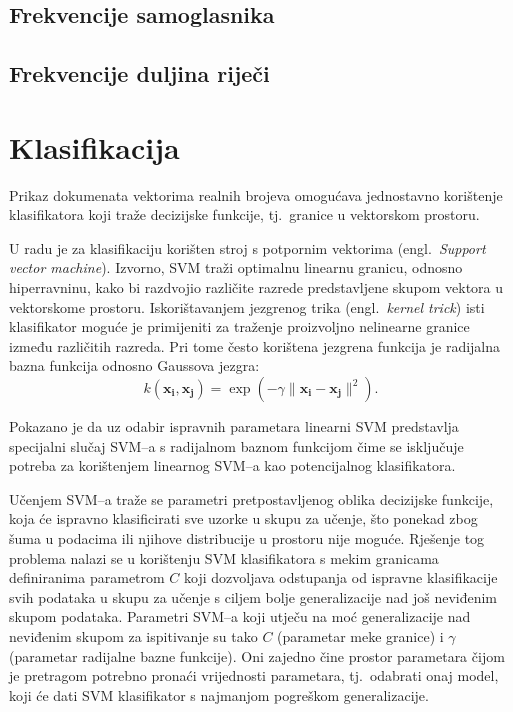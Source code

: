 \documentclass{article}
\newcommand{\engl}[1]{(engl.~\emph{#1})}
\begin{document}
\subsection{Frekvencije samoglasnika}
\subsection{Frekvencije duljina riječi}

\section{Klasifikacija}
Prikaz dokumenata vektorima realnih brojeva omogućava jednostavno korištenje
klasifikatora koji traže decizijske funkcije, tj.~granice u vektorskom
prostoru.


U radu je za klasifikaciju korišten stroj s potpornim vektorima \engl{Support
vector machine}. Izvorno, SVM traži optimalnu linearnu granicu, odnosno
hiperravninu, kako bi razdvojio različite razrede predstavljene skupom vektora u
vektorskome prostoru. Iskorištavanjem jezgrenog trika \engl{kernel trick} isti
klasifikator moguće je primijeniti za traženje proizvoljno nelinearne granice
između različitih razreda. Pri tome često korištena jezgrena funkcija je
radijalna bazna funkcija odnosno Gaussova jezgra:
\begin{equation}
k(\mathbf{x_i},\mathbf{x_j})=\exp(-\gamma \|\mathbf{x_i} - \mathbf{x_j}\|^2).
\end{equation}

Pokazano je da uz odabir ispravnih parametara \citep{keerthi2003asymptotic} linearni SVM
predstavlja specijalni slučaj SVM--a s radijalnom baznom funkcijom čime
se isključuje potreba za korištenjem linearnog SVM--a kao potencijalnog
klasifikatora.

Učenjem SVM--a traže se parametri pretpostavljenog oblika decizijske funkcije,
koja će ispravno klasificirati sve uzorke u skupu za učenje, što ponekad zbog
šuma u podacima ili njihove distribucije u prostoru nije moguće. Rješenje tog
problema nalazi se u korištenju SVM klasifikatora s mekim granicama definiranima
parametrom $C$ koji dozvoljava odstupanja od ispravne klasifikacije svih podataka
u skupu za učenje s ciljem bolje generalizacije nad još neviđenim skupom
podataka. Parametri SVM--a koji utječu na moć generalizacije nad neviđenim skupom
za ispitivanje su tako $C$ (parametar meke granice) i $\gamma$ (parametar
radijalne bazne funkcije). Oni zajedno čine prostor parametara čijom je pretragom
potrebno pronaći vrijednosti parametara, tj.~odabrati onaj model, koji će dati
SVM klasifikator s najmanjom pogreškom generalizacije.
\end{document}
